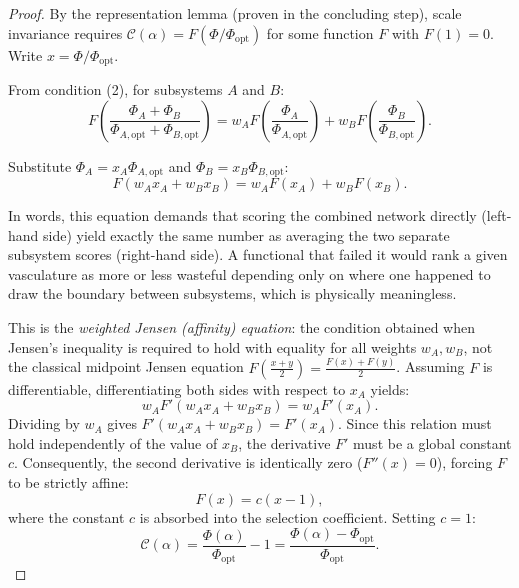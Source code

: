 \begin{proof}
By the representation lemma (proven in the concluding step), scale invariance
requires $\mathcal{C}(\alpha) = F(\Phi/\Phi_{\mathrm{opt}})$ for some function
$F$ with $F(1) = 0$. Write $x = \Phi/\Phi_{\mathrm{opt}}$.

From condition (2), for subsystems $A$ and $B$:
\begin{equation}
    F\left(\frac{\Phi_A + \Phi_B}{\Phi_{A,\mathrm{opt}} + \Phi_{B,\mathrm{opt}}}\right)
    = w_A F\left(\frac{\Phi_A}{\Phi_{A,\mathrm{opt}}}\right)
    + w_B F\left(\frac{\Phi_B}{\Phi_{B,\mathrm{opt}}}\right).
\end{equation}

Substitute $\Phi_A = x_A \Phi_{A,\mathrm{opt}}$ and $\Phi_B = x_B
\Phi_{B,\mathrm{opt}}$:
\begin{equation}
    F(w_A x_A + w_B x_B) = w_A F(x_A) + w_B F(x_B).
\end{equation}

In words, this equation demands that scoring the combined network directly
(left-hand side) yield exactly the same number as averaging the two separate
subsystem scores (right-hand side). A functional that failed it would rank a
given vasculature as more or less wasteful depending only on where one happened
to draw the boundary between subsystems, which is physically meaningless.

This is the \emph{weighted Jensen (affinity) equation}: the condition
obtained when Jensen's inequality is required to hold with equality for all
weights $w_A,w_B$, not the classical midpoint Jensen equation
$F\!\left(\tfrac{x+y}{2}\right)=\tfrac{F(x)+F(y)}{2}$. Assuming $F$ is
differentiable, differentiating both sides with respect to $x_A$ yields:
\begin{equation}
    w_A F'(w_A x_A + w_B x_B) = w_A F'(x_A).
\end{equation}
Dividing by $w_A$ gives $F'(w_A x_A + w_B x_B) = F'(x_A)$. Since this relation
must hold independently of the value of $x_B$, the derivative $F'$ must be a
global constant $c$. Consequently, the second derivative is identically zero
($F''(x) = 0$), forcing $F$ to be strictly affine:
\begin{equation}
    F(x) = c(x - 1),
\end{equation}
where the constant $c$ is absorbed into the selection coefficient. Setting $c =
1$:
\begin{equation}
    \mathcal{C}(\alpha) = \frac{\Phi(\alpha)}{\Phi_{\mathrm{opt}}} - 1
    = \frac{\Phi(\alpha) - \Phi_{\mathrm{opt}}}{\Phi_{\mathrm{opt}}}.
\end{equation}
\end{proof}

